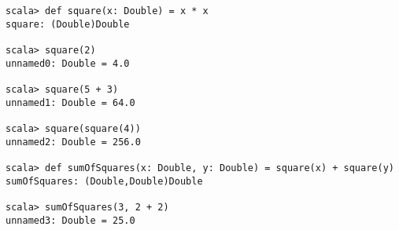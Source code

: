 

\begin{lstlisting}
scala> def square(x: Double) = x * x
square: (Double)Double

scala> square(2)
unnamed0: Double = 4.0

scala> square(5 + 3)
unnamed1: Double = 64.0

scala> square(square(4))
unnamed2: Double = 256.0

scala> def sumOfSquares(x: Double, y: Double) = square(x) + square(y)
sumOfSquares: (Double,Double)Double

scala> sumOfSquares(3, 2 + 2)
unnamed3: Double = 25.0
\end{lstlisting}



\example\ 
 
